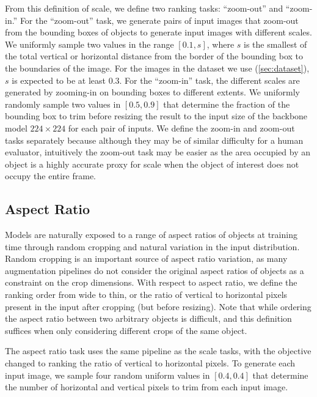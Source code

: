 From this definition of scale, we define two ranking tasks: ``zoom-out'' and ``zoom-in.''
For the ``zoom-out'' task, we generate pairs of input images that zoom-out from the bounding boxes of objects to generate input images with different scales.
We uniformly sample two values in the range $[0.1, s]$, where $s$ is the smallest of the total vertical or horizontal distance from the border of the bounding box to the boundaries of the image.
For the images in the dataset we use (\autoref{sec:dataset}), $s$ is expected to be at least $0.3$.
For the ``zoom-in'' task, the different scales are generated by zooming-in on bounding boxes to different extents.
We uniformly randomly sample two values in $[0.5, 0.9]$ that determine the fraction of the bounding box to trim before resizing the result to the input size of the backbone model $224\times224$ for each pair of inputs.
We define the zoom-in and zoom-out tasks separately because although they may be of similar difficulty for a human evaluator, intuitively the zoom-out task may be easier as the area occupied by an object is a highly accurate proxy for scale when the object of interest does not occupy the entire frame.


\subsection{Aspect Ratio}
Models are naturally exposed to a range of aspect ratios of objects at training time through random cropping and natural variation in the input distribution.
Random cropping is an important source of aspect ratio variation, as many augmentation pipelines do not consider the original aspect ratios of objects as a constraint on the crop dimensions.
With respect to aspect ratio, we define the ranking order from wide to thin, or the ratio of vertical to horizontal pixels present in the input after cropping (but before resizing).
Note that while ordering the aspect ratio between two arbitrary objects is difficult, and this definition suffices when only considering different crops of the same object.

The aspect ratio task uses the same pipeline as the scale tasks, with the objective changed to ranking the ratio of vertical to horizontal pixels.
To generate each input image, we sample four random uniform values in $[0.4, 0.4]$ that determine the number of horizontal and vertical pixels to trim from each input image.

